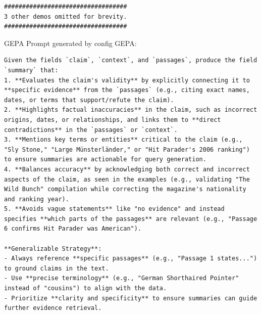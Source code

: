 \begin{instructbox}
\begin{lstlisting}[breakindent=0pt, breaklines=true, breakatwhitespace=true, frame=single, backgroundcolor=\color{green!10}]
##################################
3 other demos omitted for brevity.
##################################

\end{lstlisting}

GEPA Prompt generated by config GEPA:
\begin{lstlisting}[breakindent=0pt, breaklines=true, breakatwhitespace=true, frame=single, backgroundcolor=\color{blue!10}]
Given the fields `claim`, `context`, and `passages`, produce the field `summary` that:  
1. **Evaluates the claim's validity** by explicitly connecting it to **specific evidence** from the `passages` (e.g., citing exact names, dates, or terms that support/refute the claim).  
2. **Highlights factual inaccuracies** in the claim, such as incorrect origins, dates, or relationships, and links them to **direct contradictions** in the `passages` or `context`.  
3. **Mentions key terms or entities** critical to the claim (e.g., "Sly Stone," "Large Münsterländer," or "Hit Parader's 2006 ranking") to ensure summaries are actionable for query generation.  
4. **Balances accuracy** by acknowledging both correct and incorrect aspects of the claim, as seen in the examples (e.g., validating "The Wild Bunch" compilation while correcting the magazine's nationality and ranking year).  
5. **Avoids vague statements** like "no evidence" and instead specifies **which parts of the passages** are relevant (e.g., "Passage 6 confirms Hit Parader was American").  

**Generalizable Strategy**:  
- Always reference **specific passages** (e.g., "Passage 1 states...") to ground claims in the text.  
- Use **precise terminology** (e.g., "German Shorthaired Pointer" instead of "cousins") to align with the data.  
- Prioritize **clarity and specificity** to ensure summaries can guide further evidence retrieval.
\end{lstlisting}
\end{instructbox}
